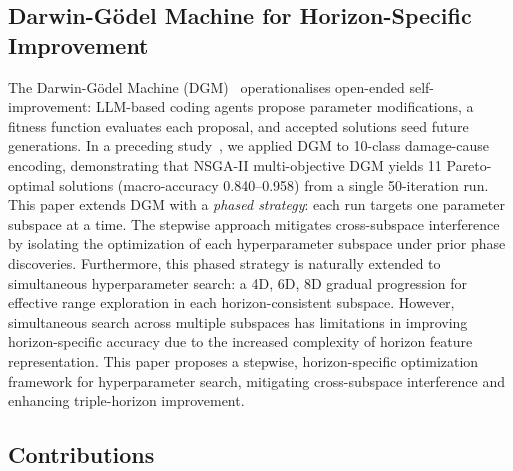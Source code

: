 ﻿\documentclass[twocolumn]{article}
\begin{document}
\subsection{Darwin-G\"{o}del Machine for Horizon-Specific Improvement}

The Darwin-G\"{o}del Machine (DGM)~\cite{liu2025dgm} operationalises
open-ended self-improvement: LLM-based coding agents propose
parameter modifications, a fitness function evaluates each proposal,
and accepted solutions seed future generations.
In a preceding study~\cite{yasuno2026dgm}, we applied DGM to
10-class damage-cause encoding, demonstrating that NSGA-II
multi-objective DGM yields 11 Pareto-optimal solutions
(macro-accuracy 0.840--0.958) from a single 50-iteration run.
This paper extends DGM with a \emph{phased strategy}:
each run targets one parameter subspace at a time.
The stepwise approach mitigates cross-subspace interference by isolating the optimization 
of each hyperparameter subspace under prior phase discoveries.
Furthermore, this phased strategy is naturally extended to simultaneous hyperparameter search:
a 4D, 6D, 8D gradual progression for effective range exploration in each horizon-consistent subspace.
However, simultaneous search across multiple subspaces has limitations in improving horizon-specific accuracy
due to the increased complexity of horizon feature representation.
This paper proposes a stepwise, horizon-specific optimization framework for hyperparameter search, 
mitigating cross-subspace interference and enhancing triple-horizon improvement.

\subsection{Contributions}
\end{document}
